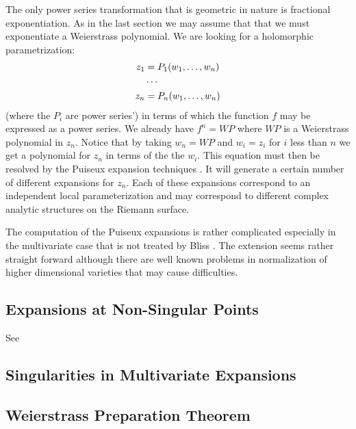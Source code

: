 The only power series transformation that is geometric in nature is
fractional exponentiation.  As in the last section we may assume that
that we must exponentiate a Weierstrass polynomial.  We are looking
for a holomorphic parametrization:
\[
\begin{aligned}
  z_1 &= P_1(w_1, \ldots ,w_n)\\
    &\cdots\cr
  z_n &= P_n(w_1, \ldots ,w_n)
\end{aligned}
\]
(where the $P_i$ are power series') in terms of which the function $f$
may be expressed as a power series.  We already have $f^n = WP$ where
$WP$ is a Weierstrass polynomial in $z_n$.  Notice that by taking
$w_{n} = WP$ and $w_i = z_i$ for $i$ less than $n$ we get a polynomial
for $z_n$ in terms of the the $w_i$.  This equation must then be
resolved by the Puiseux expansion techniques \cite{Bliss:Curves}.  It
will generate a certain number of different expansions for $z_n$.
Each of these expansions correspond to an independent local
parameterization and may correspond to different complex analytic
structures on the Riemann surface.

The computation of the Puiseux expansions is rather complicated
especially in the multivariate case that is not treated by Bliss
\cite{Bliss:Curves}.
The extension seems rather straight forward although there are
well known problems in normalization of higher dimensional varieties
that may cause difficulties.

\subsection{Expansions at Non-Singular Points}

See \cite{Leavitt66}

\subsection{Singularities in Multivariate Expansions}

\subsection{Weierstrass Preparation Theorem}

